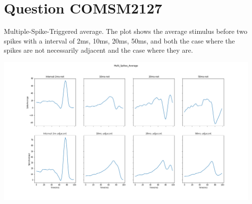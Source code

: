 \documentclass[fleqn,11pt]{article}
\begin{document}
\section*{Question COMSM2127}
\par Multiple-Spike-Triggered average.
     The plot shows the average stimulus before two spikes with 
     a interval of 2ms, 10ms, 20ms, 50ms, and both the case 
     where the spikes are not necessarily adjacent and the case where they are.
    \begin{center} 
        \includegraphics[width=15cm]{graphs/MultiAverage.png}
    \end{center}
\end{document}
